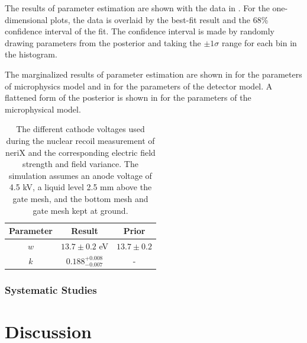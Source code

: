 The results of parameter estimation are shown with the data in \figref{}.  For the one-dimensional plots, the data is overlaid by the best-fit result and the 68\% confidence interval of the fit.  The confidence interval is made by randomly drawing parameters from the posterior and taking the $\pm 1 \sigma$ range for each bin in the histogram.






The marginalized results of parameter estimation are shown in  for the parameters of microphysics model and in  for the parameters of the detector model.  A flattened form of the posterior is shown in  for the parameters of the microphysical model.  


\begin{table}[t]
\centering
\def\arraystretch{1.3}
\begin{tabular}{c|cc}
Parameter & Result & Prior \\
\hline
$w$ & $13.7 \pm 0.2$ eV & $13.7 \pm 0.2$ \\
$k$ & $0.188^{+0.008}_{-0.007}$ & - \\
\end{tabular}
\caption{The different cathode voltages used during the nuclear recoil measurement of neriX and the corresponding electric field strength and field variance.  The simulation assumes an anode voltage of 4.5 kV, a liquid level 2.5 mm above the gate mesh, and the bottom mesh and gate mesh kept at ground.}
\label{tab:nerix_electric_fields}
\end{table}




\subsubsection{Systematic Studies}








\section{Discussion}



